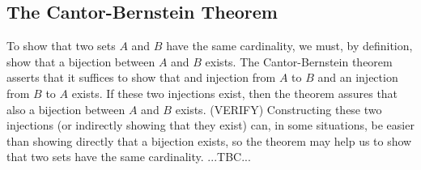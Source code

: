 







\subsection{The Cantor-Bernstein Theorem}
To show that two sets $A$ and $B$ have the same cardinality, we must, by definition, show that a bijection between $A$ and $B$ exists. The Cantor-Bernstein theorem asserts that it suffices to show that and injection from $A$ to $B$ and an injection from $B$ to $A$ exists. If these two injections exist, then the theorem assures that also a bijection between $A$ and $B$ exists. (VERIFY) Constructing these two injections (or indirectly showing that they exist) can, in some situations, be easier than showing directly that a bijection exists, so the theorem may help us to show that two sets have the same cardinality. ...TBC...

